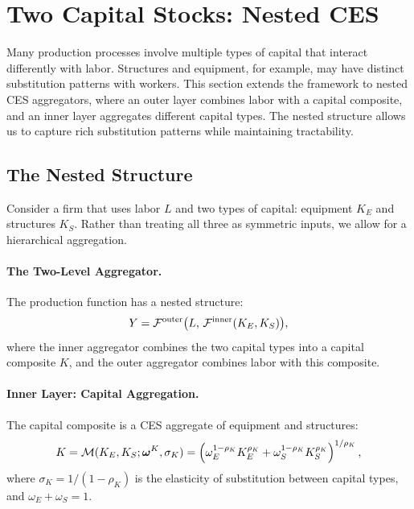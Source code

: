\section{Two Capital Stocks: Nested CES}
\label{sec:nested-capital}

Many production processes involve multiple types of capital that interact differently with labor. Structures and equipment, for example, may have distinct substitution patterns with workers. This section extends the framework to nested CES aggregators, where an outer layer combines labor with a capital composite, and an inner layer aggregates different capital types. The nested structure allows us to capture rich substitution patterns while maintaining tractability.

\subsection{The Nested Structure}
\label{subsec:nested-structure}

Consider a firm that uses labor $L$ and two types of capital: equipment $K_E$ and structures $K_S$. Rather than treating all three as symmetric inputs, we allow for a hierarchical aggregation.

\paragraph{The Two-Level Aggregator.}
The production function has a nested structure:
\begin{equation}
Y = \mathcal{F}^{\text{outer}}\bigl(L, \, \mathcal{F}^{\text{inner}}(K_E, K_S)\bigr),
\label{eq:nested-production}
\end{equation}
where the inner aggregator combines the two capital types into a capital composite $K$, and the outer aggregator combines labor with this composite.

\paragraph{Inner Layer: Capital Aggregation.}
The capital composite is a CES aggregate of equipment and structures:
\begin{equation}
K = \mathcal{M}(K_E, K_S; \boldsymbol{\omega}^K, \sigma_K) = \left( \omega_E^{1-\rho_K} K_E^{\rho_K} + \omega_S^{1-\rho_K} K_S^{\rho_K} \right)^{1/\rho_K},
\label{eq:capital-composite}
\end{equation}
where $\sigma_K = 1/(1-\rho_K)$ is the elasticity of substitution between capital types, and $\omega_E + \omega_S = 1$.


